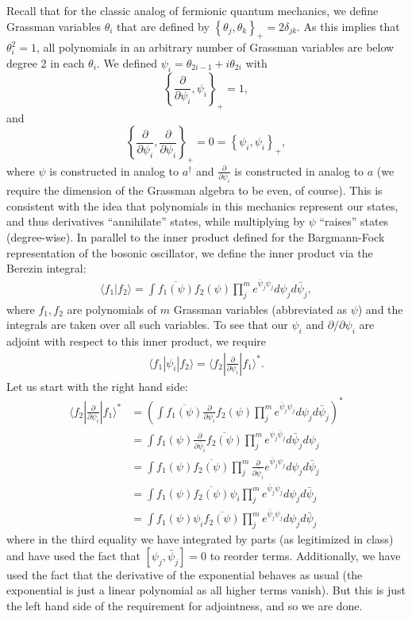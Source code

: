 \documentclass{../mathnotes}
\begin{document}
Recall that for the classic analog of fermionic quantum mechanics, we define Grassman variables $\theta_i$ that are defined by
$\left\{ \theta_j,\theta_k \right\}_+=2\delta_{jk}$. As this implies that $\theta_i^2=1$, all polynomials in an arbitrary number
of Grassman variables are below degree 2 in each $\theta_i$. We defined $\psi_i=\theta_{2i-1}+i\theta_{2i}$ with 
\[\left\{ \frac{\partial}{\partial \psi_i},\psi_i \right\}_+=1,\]
and
\[\left\{ \frac{\partial}{\partial \psi_i},\frac{\partial}{\partial \psi_i} \right\}_+=0=\left\{ \psi_i,\psi_i \right\}_+,\]
where $\psi$ is constructed in analog to $a^\dagger$ and $\frac{\partial}{\partial \psi_i}$ is constructed in analog to $a$ (we require the dimension
of the Grassman algebra to be even, of course). This is
consistent with the idea that polynomials in this mechanics represent our states, and thus derivatives ``annihilate'' states, while
multiplying by $\psi$ ``raises'' states (degree-wise). In parallel to the inner product defined for the Bargmann-Fock
representation of the bosonic oscillator, we define the inner product via the Berezin integral:
\begin{align*}
    \langle f_1 | f_2 \rangle = \int \overline{f_1(\psi)}f_2(\psi)\prod_j^m e^{\bar\psi_j \psi_j}d\psi_j d\bar\psi_j,
\end{align*}
where $f_1,f_2$ are polynomials of $m$ Grassman variables (abbreviated as $\psi$) and the integrals are taken over all such variables.
To see that our $\psi_i$ and $\partial/\partial\psi_i$ are adjoint with respect to this inner product, we require
\begin{align*}
    \langle f_1 | \psi_i | f_2 \rangle =  \langle f_2 | \frac{\partial}{\partial \psi_i} | f_1 \rangle^*.
\end{align*}
Let us start with the right hand side:
\begin{align*}
    \langle f_2 | \frac{\partial}{\partial \psi_i} | f_1 \rangle^*&=\left(\int \overline{f_1(\psi)}\frac{\partial}{\partial \psi_i}f_2(\psi)\prod_j^me^{\bar\psi_j \psi_j} d\psi_j d\bar\psi_j\right)^*\\
    &=\int f_1(\psi)\frac{\partial}{\partial\bar\psi_i}\overline{f_2(\psi)}\prod_j^me^{\psi_j\bar\psi_j} d\bar\psi_j d\psi_j\\
    &=\int f_1(\psi)\overline{f_2(\psi)}\prod_j^m\frac{\partial}{\partial\bar\psi_i}e^{\bar\psi_j\psi_j} d\psi_j d\bar\psi_j\\
    &=\int f_1(\psi)\overline{f_2(\psi)}\psi_i\prod_j^me^{\bar\psi_j\psi_j} d\psi_j d\bar\psi_j\\
    &=\int f_1(\psi)\psi_i\overline{f_2(\psi)}\prod_j^me^{\bar\psi_j\psi_j} d\psi_j d\bar\psi_j
\end{align*}
where in the third equality we have integrated by parts (as legitimized in class) and have used the fact that $[\psi_j,\bar\psi_j]=0$ 
to reorder terms. Additionally, we have used the fact that the derivative of the exponential behaves as usual (the exponential is just a linear polynomial
as all higher terms vanish). But this is just the left hand side of the requirement for adjointness, and so we are done.
\end{document}

